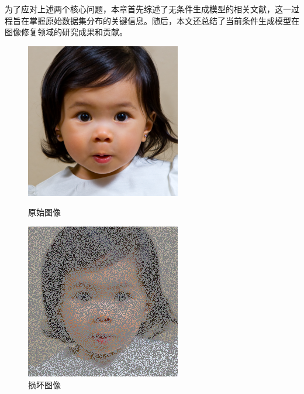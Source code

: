 为了应对上述两个核心问题，本章首先综述了无条件生成模型的相关文献，这一过程旨在掌握原始数据集分布的关键信息。随后，本文还总结了当前条件生成模型在图像修复领域的研究成果和贡献。
\begin{figure}[H]
  \centering
  \begin{minipage}[b]{0.45\linewidth}
    \includegraphics[width=\linewidth]{figures/intro/input.png}
    \caption{原始图像}
    \label{original image }
  \end{minipage}
  \hspace{0.5cm} %
  \begin{minipage}[b]{0.45\linewidth}
    \includegraphics[width=\linewidth]{figures/intro/label.png}
    \caption{损坏图像}
    \label{inpainted image}
  \end{minipage}
\end{figure}
